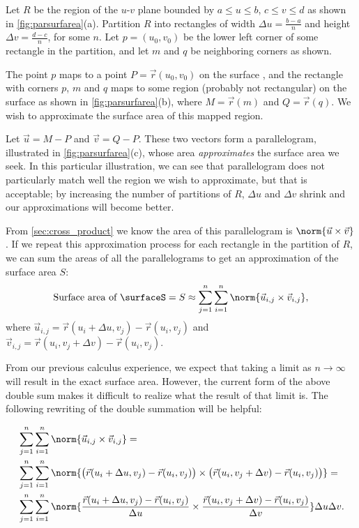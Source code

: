 Let $R$ be the region of the $u$-$v$ plane bounded by $a\leq u\leq b$, $c\leq v\leq d$ as shown in \autoref{fig:parsurfarea}(a). Partition $R$ into rectangles of width $\Delta u = \frac{b-a}n$ and height $\Delta v = \frac{d-c}n$, for some $n$. Let $p=(u_0,v_0)$ be the lower left corner of some rectangle in the partition, and let $m$ and $q$ be neighboring corners as shown.

The point $p$ maps to a point $P = \vec r(u_0,v_0)$ on the surface \surfaceS, and the rectangle with corners $p$, $m$ and $q$ maps to some region (probably not rectangular) on the surface as shown in \autoref{fig:parsurfarea}(b), where $M = \vec r(m)$ and $Q = \vec r(q)$. We wish to approximate the surface area of this mapped region.

Let $\vec u = M-P$ and $\vec v = Q-P$. These two vectors form a parallelogram, illustrated in \autoref{fig:parsurfarea}(c), whose area \emph{approximates} the surface area we seek. In this particular illustration, we can see that parallelogram does not particularly match well the region we wish to approximate, but that is acceptable; by increasing the number of partitions of $R$, $\Delta u$ and $\Delta v$ shrink and our approximations will become better.

From \autoref{sec:cross_product} we know the area of this parallelogram is $\norm{\vec u\times \vec v}$. If we repeat this approximation process for each rectangle in the partition of $R$, we can sum the areas of all the parallelograms to get an approximation of the surface area $S$:
\[
\text{Surface area of \surfaceS} =S
\approx \sum_{j=1}^n\sum_{i=1}^n \norm{\vec u_{i,j}\times \vec v_{i,j}},
\]
where $\vec u_{i,j} = \vec r(u_i+\Delta u,v_j) - \vec r(u_i,v_j)$ and $\vec v_{i,j} = \vec r(u_i,v_j+\Delta v)-\vec r(u_i,v_j)$.

From our previous calculus experience, we expect that taking a limit as $n\to \infty$ will result in the exact surface area. However, the current form of the above double sum makes it difficult to realize what the result of that limit is. The following rewriting of the double summation will be helpful:

\begin{align*}
&\sum_{j=1}^n\sum_{i=1}^n \norm{\vec u_{i,j}\times \vec v_{i,j}}= \\ 
&\sum_{j=1}^n\sum_{i=1}^n \norm{\bigl(\vec r(u_i+\Delta u,v_j) - \vec r(u_i,v_j)\bigr) \times \bigl(\vec r(u_i,v_j+\Delta v)-\vec r(u_i,v_j)\bigr)}= \\
&\sum_{j=1}^n\sum_{i=1}^n \norm{\frac{\vec r(u_i+\Delta u,v_j) - \vec r(u_i,v_j)}{\Delta u} \times \frac{\vec r(u_i,v_j+\Delta v)-\vec r(u_i,v_j)}{\Delta v}}\Delta u\Delta v.
\end{align*}

